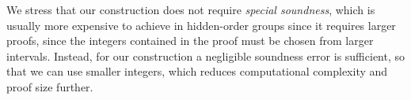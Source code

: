 

We stress that our construction does not require \emph{special soundness}, which is usually more expensive to achieve in hidden-order groups since it requires larger proofs, since the integers contained in the proof must be chosen from larger intervals. Instead, for our construction a negligible soundness error is sufficient, so that we can use smaller integers, which reduces computational complexity and proof size further.


